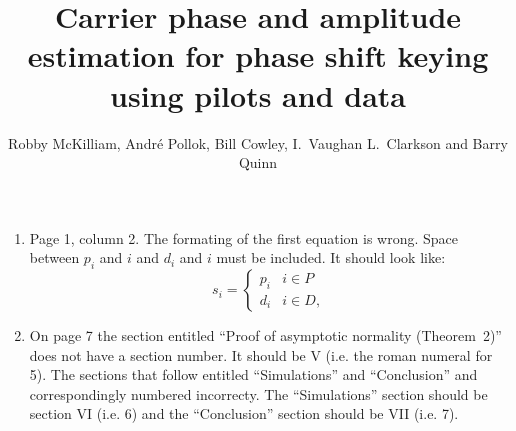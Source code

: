 \documentclass[a4paper,10pt]{article}
\title{Carrier phase and amplitude estimation for phase shift keying using pilots and data}
\author{Robby McKilliam, Andr\'{e} Pollok, Bill Cowley, I.\ Vaughan L.\ Clarkson and Barry Quinn  
}
\begin{document}

\begin{enumerate}
\item Page 1, column 2.  The formating of the first equation is wrong.  Space between $p_i$ and $i$ and $d_i$ and $i$ must be included.  It should look like:
\[
s_i = \begin{cases}
p_i & i \in P \\
d_i & i \in D,
\end{cases}
\]


\item On page 7 the section entitled ``Proof of asymptotic normality (Theorem~2)'' does not have a section number.  It should be V (i.e. the roman numeral for 5).  The sections that follow entitled ``Simulations'' and ``Conclusion'' and correspondingly numbered incorrecty.  The ``Simulations'' section should be section VI (i.e. 6) and the ``Conclusion'' section should be VII (i.e. 7). 

\end{enumerate}
\end{document}
